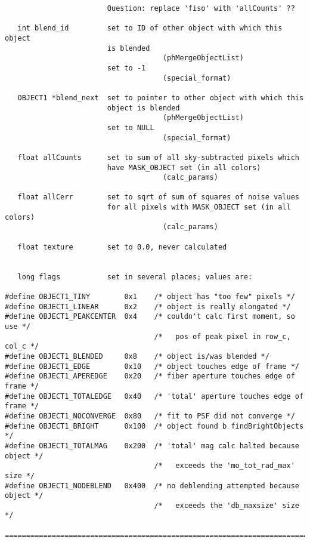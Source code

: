 \begin{verbatim}
                        Question: replace 'fiso' with 'allCounts' ??

   int blend_id         set to ID of other object with which this object 
                        is blended
                                     (phMergeObjectList)
                        set to -1
                                     (special_format)

   OBJECT1 *blend_next  set to pointer to other object with which this
                        object is blended
                                     (phMergeObjectList)
                        set to NULL
                                     (special_format)
                             
   float allCounts      set to sum of all sky-subtracted pixels which
                        have MASK_OBJECT set (in all colors) 
                                     (calc_params)

   float allCerr        set to sqrt of sum of squares of noise values
                        for all pixels with MASK_OBJECT set (in all colors)
                                     (calc_params)

   float texture        set to 0.0, never calculated

 
   long flags           set in several places; values are:

#define OBJECT1_TINY        0x1    /* object has "too few" pixels */
#define OBJECT1_LINEAR      0x2    /* object is really elongated */
#define OBJECT1_PEAKCENTER  0x4    /* couldn't calc first moment, so use */
                                   /*   pos of peak pixel in row_c, col_c */
#define OBJECT1_BLENDED     0x8    /* object is/was blended */
#define OBJECT1_EDGE        0x10   /* object touches edge of frame */
#define OBJECT1_APEREDGE    0x20   /* fiber aperture touches edge of frame */
#define OBJECT1_TOTALEDGE   0x40   /* 'total' aperture touches edge of frame */
#define OBJECT1_NOCONVERGE  0x80   /* fit to PSF did not converge */
#define OBJECT1_BRIGHT      0x100  /* object found b findBrightObjects */
#define OBJECT1_TOTALMAG    0x200  /* 'total' mag calc halted because object */
                                   /*   exceeds the 'mo_tot_rad_max' size */
#define OBJECT1_NODEBLEND   0x400  /* no deblending attempted because object */
                                   /*   exceeds the 'db_maxsize' size */

==========================================================================
\end{verbatim}

